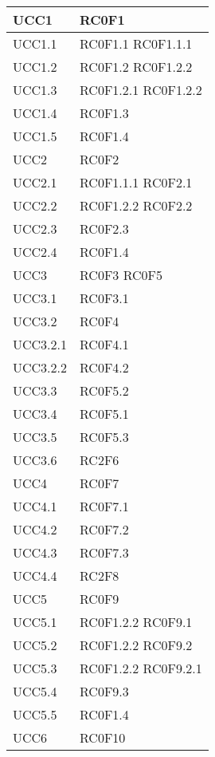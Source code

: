 \begin{center}
\begin{longtable}{|p{5cm}|p{5cm}|}
UCC1 		& RC0F1 \\\hline
UCC1.1		& RC0F1.1 \newline RC0F1.1.1 \\\hline
UCC1.2		& RC0F1.2 \newline RC0F1.2.2 \\\hline
UCC1.3		& RC0F1.2.1 \newline RC0F1.2.2 \\\hline
UCC1.4		& RC0F1.3 \\\hline
UCC1.5		& RC0F1.4 \\\hline
UCC2		& RC0F2 \\\hline
UCC2.1		& RC0F1.1.1 \newline RC0F2.1 \\\hline
UCC2.2		& RC0F1.2.2 \newline RC0F2.2 \\\hline
UCC2.3		& RC0F2.3 \\\hline
UCC2.4		& RC0F1.4 \\\hline
UCC3		& RC0F3 \newline RC0F5 \\\hline
UCC3.1		& RC0F3.1 \\\hline
UCC3.2		& RC0F4 \\\hline
UCC3.2.1	& RC0F4.1 \\\hline
UCC3.2.2	& RC0F4.2 \\\hline
UCC3.3		& RC0F5.2 \\\hline
UCC3.4		& RC0F5.1 \\\hline
UCC3.5		& RC0F5.3 \\\hline
UCC3.6		& RC2F6 \\\hline
UCC4		& RC0F7 \\\hline
UCC4.1		& RC0F7.1 \\\hline
UCC4.2		& RC0F7.2 \\\hline
UCC4.3		& RC0F7.3 \\\hline
UCC4.4		& RC2F8 \\\hline
UCC5		& RC0F9 \\\hline
UCC5.1		& RC0F1.2.2 \newline RC0F9.1 \\\hline
UCC5.2		& RC0F1.2.2 \newline RC0F9.2 \\\hline
UCC5.3		& RC0F1.2.2 \newline RC0F9.2.1 \\\hline
UCC5.4		& RC0F9.3 \\\hline
UCC5.5		& RC0F1.4 \\\hline
UCC6		& RC0F10 \\\hline

\end{longtable}
\end{center}
